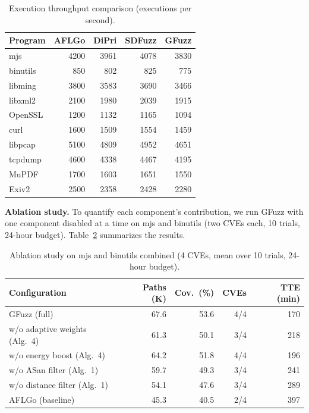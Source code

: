 \documentclass[preprint,12pt,3p]{elsarticle}
\begin{document}
\begin{table}[t]
\centering
\small
\caption{Execution throughput comparison (executions per second).}
\label{tbl:throughput}
\begin{tabular}{lrrrr}
\toprule
\textbf{Program} & \textbf{AFLGo} & \textbf{DiPri}
  & \textbf{SDFuzz} & \textbf{GFuzz} \\
\midrule
mjs      & 4200 & 3961 & 4078 & 3830 \\
binutils & 850  & 802  & 825  & 775 \\
libming  & 3800 & 3583 & 3690 & 3466 \\
libxml2  & 2100 & 1980 & 2039 & 1915 \\
OpenSSL  & 1200 & 1132 & 1165 & 1094 \\
curl     & 1600 & 1509 & 1554 & 1459 \\
libpcap  & 5100 & 4809 & 4952 & 4651 \\
tcpdump  & 4600 & 4338 & 4467 & 4195 \\
MuPDF    & 1700 & 1603 & 1651 & 1550 \\
Exiv2    & 2500 & 2358 & 2428 & 2280 \\
\bottomrule
\end{tabular}
\end{table}

\textbf{Ablation study.}  To quantify each component's contribution, we run
GFuzz with one component disabled at a time on mjs and binutils (two CVEs
each, 10 trials, 24-hour budget).  Table~\ref{tbl:ablation} summarizes the
results.

\begin{table}[t]
\centering
\small
\caption{Ablation study on mjs and binutils combined (4 CVEs, mean over
  10 trials, 24-hour budget).}
\label{tbl:ablation}
\begin{tabular}{lrrrr}
\toprule
\textbf{Configuration} & \textbf{Paths (K)} & \textbf{Cov.\ (\%)}
  & \textbf{CVEs} & \textbf{TTE (min)} \\
\midrule
GFuzz (full)                  & 67.6 & 53.6 & 4/4 & 170 \\
w/o adaptive weights (Alg.~4) & 61.3 & 50.1 & 3/4 & 218 \\
w/o energy boost (Alg.~4)     & 64.2 & 51.8 & 4/4 & 196 \\
w/o ASan filter (Alg.~1)      & 59.7 & 49.3 & 3/4 & 241 \\
w/o distance filter (Alg.~1)  & 54.1 & 47.6 & 3/4 & 289 \\
AFLGo (baseline)              & 45.3 & 40.5 & 2/4 & 397 \\
\bottomrule
\end{tabular}
\end{table}
\end{document}
